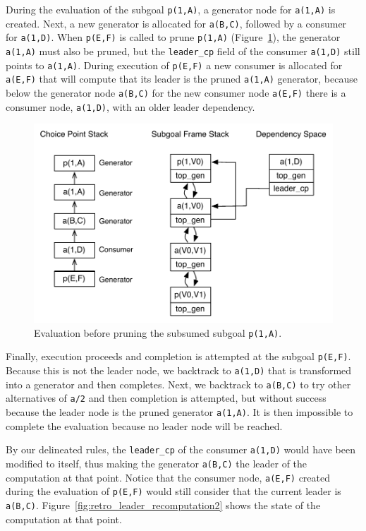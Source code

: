 During the evaluation of the subgoal \texttt{p(1,A)}, a generator node
for \texttt{a(1,A)} is created. Next, a new generator is allocated for \texttt{a(B,C)},
followed by a consumer for \texttt{a(1,D)}. When \texttt{p(E,F)} is called to
prune \texttt{p(1,A)} (Figure~\ref{fig:retro_leader_recomputation}), the generator \texttt{a(1,A)}
must also be pruned, but the \texttt{leader\_cp} field of the consumer \texttt{a(1,D)} still points
to \texttt{a(1,A)}. During execution of \texttt{p(E,F)} a new consumer is allocated for \texttt{a(E,F)} that
will compute that its leader is the pruned \texttt{a(1,A)} generator, because below
the generator node \texttt{a(B,C)} for the new consumer node \texttt{a(E,F)} there is a consumer node,
\texttt{a(1,D)}, with an older leader dependency.

\begin{figure}[ht]
  \centering
    \includegraphics[scale=0.6]{retro_leader_recomputation.pdf}
  \caption{Evaluation before pruning the subsumed subgoal \texttt{p(1,A)}.}
  \label{fig:retro_leader_recomputation}
\end{figure}

Finally, execution proceeds and completion is attempted at the subgoal \texttt{p(E,F)}.
Because this is not the leader node, we backtrack to \texttt{a(1,D)} that is transformed
into a generator and then completes. Next, we backtrack to \texttt{a(B,C)} to try other
alternatives of \texttt{a/2} and then completion is attempted, but without success because
the leader node is the pruned generator \texttt{a(1,A)}. It is then impossible to complete
the evaluation because no leader node will be reached.

By our delineated rules, the \texttt{leader\_cp} of the consumer \texttt{a(1,D)} would have been
modified to itself, thus making the generator \texttt{a(B,C)} the leader of the computation at that point.
Notice that the consumer node, \texttt{a(E,F)} created during the evaluation of \texttt{p(E,F)} would still
consider that the current leader is \texttt{a(B,C)}. Figure~\ref{fig:retro_leader_recomputation2} shows the
state of the computation at that point.


